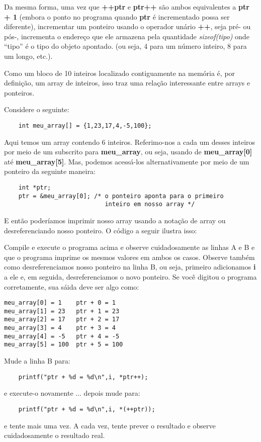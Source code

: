 Da mesma forma, uma vez que \textbf{++ptr} e \textbf{ptr++} são ambos equivalentes a \textbf{ptr + 1} (embora o ponto no programa quando \textbf{ptr} é incrementado possa ser diferente), incrementar um ponteiro usando o operador unário \textbf{++}, seja pré- ou pós-, incrementa o endereço que ele armazena pela quantidade \textit{sizeof(tipo)} onde ``tipo'' é o tipo do objeto apontado. (ou seja, 4 para um número inteiro, 8 para um longo, etc.).

Como um bloco de 10 inteiros localizado contiguamente na memória é, por definição, um array de inteiros, isso traz uma relação interessante entre arrays e ponteiros.

Considere o seguinte:
\begin{lstlisting}
	int meu_array[] = {1,23,17,4,-5,100};
\end{lstlisting}

Aqui temos um array contendo 6 inteiros. Referimo-nos a cada um desses inteiros por meio de um subscrito para \textbf{meu\_array}, ou seja, usando de \textbf{meu\_array[0]} até \textbf{meu\_array[5]}. Mas, podemos acessá-los alternativamente por meio de um ponteiro da seguinte maneira:

\begin{lstlisting}
	int *ptr;
	ptr = &meu_array[0]; /* o ponteiro aponta para o primeiro
	                        inteiro em nosso array */
\end{lstlisting}

E então poderíamos imprimir nosso array usando a notação de array ou desreferenciando nosso ponteiro. O código a seguir ilustra isso:



Compile e execute o programa acima e observe cuidadosamente as linhas A e B e que o programa imprime os mesmos valores em ambos os casos. Observe também como desreferenciamos nosso ponteiro na linha B, ou seja, primeiro adicionamos \textbf{i} a ele e, em seguida, desreferenciamos o novo ponteiro.
Se você digitou o programa corretamente, sua sáida deve ser algo como:
\lstconsolestyle
\begin{lstlisting}
meu_array[0] = 1	ptr + 0 = 1
meu_array[1] = 23	ptr + 1 = 23
meu_array[2] = 17	ptr + 2 = 17
meu_array[3] = 4	ptr + 3 = 4
meu_array[4] = -5	ptr + 4 = -5
meu_array[5] = 100	ptr + 5 = 100
\end{lstlisting}
\lstcodestyle

Mude a linha B para:
\begin{lstlisting}
	printf("ptr + %d = %d\n",i, *ptr++);
\end{lstlisting}
e execute-o novamente ... depois mude para:
\begin{lstlisting}
	printf("ptr + %d = %d\n",i, *(++ptr));
\end{lstlisting}
e tente mais uma vez. A cada vez, tente prever o resultado e observe cuidadosamente o resultado real.

